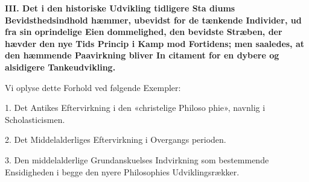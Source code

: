 %
\begin{center}
\textbf{\large III. Det i den historiske Udvikling tidligere Sta\-%
diums Bevidsthedsindhold hæmmer, ubevidst for de
tænkende Individer, ud fra sin oprindelige Eien\-%
dommelighed, den bevidste Stræben, der hævder
den nye Tids Princip i Kamp mod Fortidens; men
saaledes, at den hæmmende Paavirkning bliver In\-%
citament for en dybere og alsidigere Tankeudvikling.}
\end{center}

Vi oplyse dette Forhold ved følgende Exempler:

1. Det Antikes Eftervirkning i den «christelige Philoso\-%
phie», navnlig i Scholasticismen.

2. Det Middelalderliges Eftervirkning i Overgangs\-%
perioden.

3. Den middelalderlige Grundanskuelses Indvirkning som
bestemmende Ensidigheden i begge den nyere Philosophies
Udviklingsrækker.

\divrule

